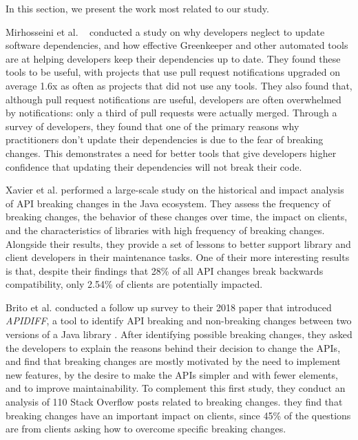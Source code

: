 In this section, we present the work most related to our study. 

\par
Mirhosseini et al. ~\cite{ACM2017_Mirhosseini_AutomatedPullRequests} conducted a study on why developers neglect to update software dependencies, and how effective Greenkeeper and other automated tools are at helping developers keep their dependencies up to date. They found these tools to be useful, with projects that use pull request notifications upgraded on average 1.6x as often as projects that did not use any tools. They also found that, although pull request notifications are useful, developers are often overwhelmed by notifications: only a third of pull requests were actually merged. Through a survey of developers, they found  that one of the primary reasons why practitioners don’t update their dependencies is due to the fear of breaking changes. This demonstrates a need for better tools that give developers higher confidence that updating their dependencies will not break their code.

\par
Xavier et al. \cite{SANER2017_Xavier_HistoricalImpactAnalyisOfAPIBreakingChanges} performed a large-scale study on the historical and impact analysis of API breaking changes in the Java ecosystem. They assess the frequency of breaking changes, the behavior of these changes over time, the impact on clients, and the characteristics of libraries with high frequency of breaking changes. Alongside their results, they provide a set of lessons to better support library and client developers in their maintenance tasks. One of their more interesting results is that, despite their findings that 28\% of all API changes break backwards compatibility, only 2.54\% of clients are potentially impacted.

\par
Brito et al.\cite{ESE2020_Brito_YouBrokeMyCode} conducted a follow up survey to their 2018 paper that introduced \textit{APIDIFF}, a tool to identify API breaking and non-breaking changes between two versions of a Java library \cite{SANER2018_Brito_APIDiff}. After identifying possible breaking changes, they asked the developers to explain the reasons behind their decision to change the APIs, and find that breaking changes are mostly motivated by the need to implement new features, by the desire to make the APIs simpler and with fewer elements, and to improve maintainability. To complement this first study, they conduct an analysis of 110 Stack Overflow posts related to breaking changes. they find that breaking changes have an important impact on clients, since 45\% of the questions are from clients asking how to overcome specific breaking changes.
